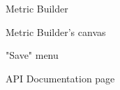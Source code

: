 			\begin{figure}[t]
				\centering
					\caption{Metric Builder}
			\end{figure}
			
			\begin{figure}[t]
				\centering
					\caption{Metric Builder's canvas}
			\end{figure}
			
			\begin{figure}[t]
				\centering
					\caption{"Save" menu}
			\end{figure}
			
			\begin{figure}[t]
				\centering
					\caption{API Documentation page}
			\end{figure}